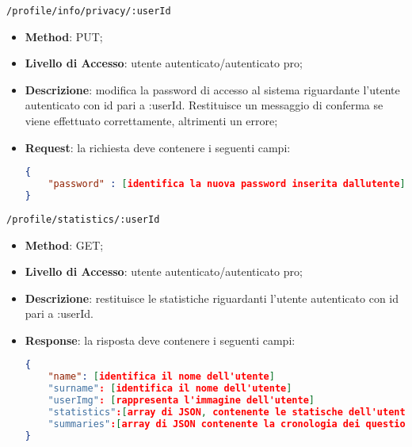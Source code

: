 	\item \texttt{/profile/info/privacy/:userId}
		\begin{itemize}
			\item \textbf{Method}: PUT;
			\item \textbf{Livello di Accesso}: utente autenticato/autenticato pro;
			\item \textbf{Descrizione}: modifica la password di accesso al sistema riguardante l'utente autenticato con id pari a :userId. Restituisce un messaggio di conferma se viene effettuato correttamente, altrimenti un errore;
			\item \textbf{Request}: la richiesta deve contenere i seguenti campi:	
\begin{lstlisting}[language=json,firstnumber=1]
{
    "password" : [identifica la nuova password inserita dallutente]
}	

\end{lstlisting}
		\end{itemize}
		
	\item \texttt{/profile/statistics/:userId}
		\begin{itemize}
			\item \textbf{Method}: GET;
			\item \textbf{Livello di Accesso}: utente autenticato/autenticato pro;
			\item \textbf{Descrizione}: restituisce le statistiche riguardanti l'utente autenticato con id pari a :userId. 
			\item \textbf{Response}: la risposta deve contenere i seguenti campi:	
\begin{lstlisting}[language=json,firstnumber=1]
{
    "name": [identifica il nome dell'utente]
    "surname": [identifica il nome dell'utente]
    "userImg": [rappresenta l'immagine dell'utente]
	"statistics":[array di JSON, contenente le statische dell'utente di ogni argomento]
	"summaries":[array di JSON contenente la cronologia dei questionari svolti dall'utente]   
}	

\end{lstlisting}
		\end{itemize}
	